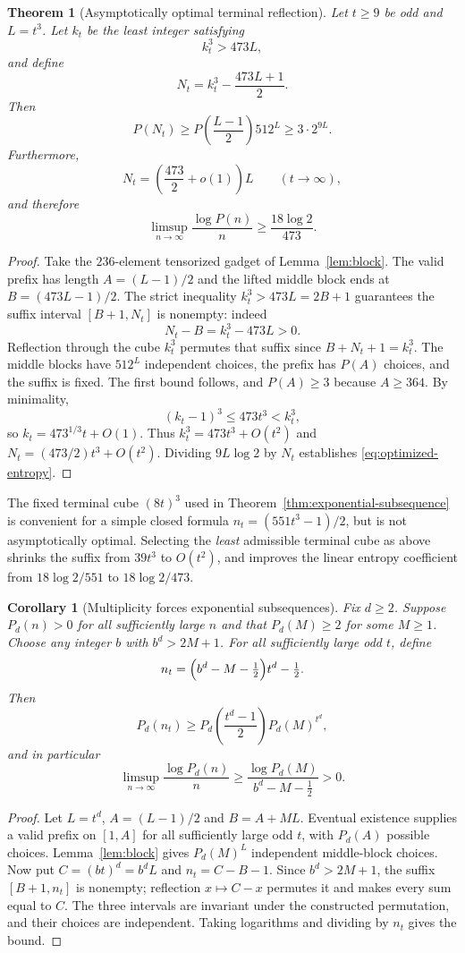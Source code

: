 \documentclass[10pt]{article}
\newtheorem{theorem}{Theorem}
\newtheorem{corollary}{Corollary}
\begin{document}
\begin{theorem}[Asymptotically optimal terminal reflection]
\label{thm:optimized-entropy}
Let $t\ge9$ be odd and $L=t^3$. Let $k_t$
be the least integer satisfying
\[
k_t^3>473L,
\]
and define
\[
\boxed{N_t=k_t^3-\frac{473L+1}{2}.}
\]
Then
\[
\boxed{P(N_t)\ge
P\!\left(\frac{L-1}{2}\right)512^L
\ge3\cdot2^{9L}.}
\]
Furthermore,
\[
N_t=\left(\frac{473}{2}+o(1)\right)L
\qquad(t\to\infty),
\]
and therefore
\begin{equation}\label{eq:optimized-entropy}
\boxed{\displaystyle
\limsup_{n\to\infty}\frac{\log P(n)}n
\ge\frac{18\log2}{473}.}
\end{equation}
\end{theorem}
\begin{proof}
Take the $236$-element tensorized gadget
of Lemma~\ref{lem:block}.
The valid prefix has length $A=(L-1)/2$
and the lifted middle block ends at
$B=(473L-1)/2$.
The strict inequality $k_t^3>473L=2B+1$
guarantees the suffix interval
$[B+1,N_t]$ is nonempty: indeed
\[
N_t-B=k_t^3-473L>0.
\]
Reflection through the cube $k_t^3$
permutes that suffix since
$B+N_t+1=k_t^3$.
The middle blocks have $512^L$ independent
choices, the prefix has $P(A)$ choices,
and the suffix is fixed.
The first bound follows, and $P(A)\ge3$
because $A\ge364$.
By minimality,
\[
(k_t-1)^3\le473t^3<k_t^3,
\]
so $k_t=473^{1/3}t+O(1)$.
Thus $k_t^3=473t^3+O(t^2)$ and
$N_t=(473/2)t^3+O(t^2)$.
Dividing $9L\log2$ by $N_t$
establishes \eqref{eq:optimized-entropy}.
\end{proof}

The fixed terminal cube $(8t)^3$ used
in Theorem~\ref{thm:exponential-subsequence}
is convenient for a simple closed formula
$n_t=(551t^3-1)/2$, but is not
asymptotically optimal. Selecting the
\emph{least} admissible terminal cube
as above shrinks the suffix from
$39t^3$ to $O(t^2)$, and improves the
linear entropy coefficient from
$18\log2/551$ to $18\log2/473$.

\begin{corollary}[Multiplicity forces exponential subsequences]
\label{cor:amplification}
Fix $d\ge2$. Suppose $P_d(n)>0$ for all
sufficiently large $n$ and that $P_d(M)\ge2$
for some $M\ge1$. Choose any integer $b$
with $b^d>2M+1$. For all sufficiently large
odd $t$, define
\[
n_t=\Bigl(b^d-M-\tfrac12\Bigr)t^d-\tfrac12.
\]
Then
\[
P_d(n_t)\ge
P_d\!\left(\frac{t^d-1}{2}\right)
P_d(M)^{t^d},
\]
and in particular
\[
\boxed{\displaystyle
\limsup_{n\to\infty}\frac{\log P_d(n)}n
\ge
\frac{\log P_d(M)}
{b^d-M-\frac12}>0.}
\]
\end{corollary}
\begin{proof}
Let $L=t^d$, $A=(L-1)/2$ and $B=A+ML$.
Eventual existence supplies a valid prefix
on $[1,A]$ for all sufficiently large odd $t$,
with $P_d(A)$ possible choices.
Lemma~\ref{lem:block} gives
$P_d(M)^L$ independent middle-block choices.
Now put $C=(bt)^d=b^dL$ and
$n_t=C-B-1$. Since $b^d>2M+1$,
the suffix $[B+1,n_t]$ is nonempty;
reflection $x\mapsto C-x$ permutes it
and makes every sum equal to $C$.
The three intervals are invariant under
the constructed permutation, and their
choices are independent. Taking logarithms
and dividing by $n_t$ gives the bound.
\end{proof}
\end{document}

